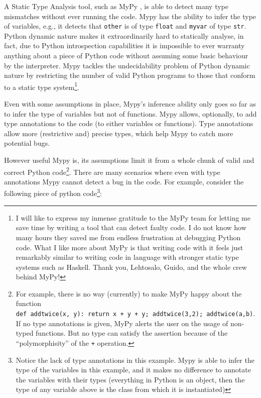 \documentclass[
11pt, %
english, %
singlespacing, %
headsepline, %
]{MastersDoctoralThesis} %
\begin{document}
A Static Type Analysis tool, such as MyPy \autocite{lehtosalo2016mypy},
is able to detect many type mismatches without ever running the code.
Mypy has the ability to infer the type of variables, e.g., it detects
that \texttt{other} is of type \texttt{float} and \texttt{myvar} of type
\texttt{str}. Python dynamic nature makes it extraordinarily hard to
statically analyse, in fact, due to Python introspection capabilities it
is impossible to ever warranty anything about a piece of Python code
without assuming some basic behaviour by the interpreter. Mypy tackles
the undecidability problem of Python dynamic nature by restricting the
number of valid Python programs to those that conform to a static type
system\footnote{I will like to express my inmense gratitude to the MyPy
  team for letting me save time by writing a tool that can detect faulty
  code. I do not know how many hours they saved me from endless
  frustration at debugging Python code. What I like more about MyPy is
  that writing code with it feels just remarkably similar to writing
  code in language with stronger static type systems such as Haskell.
  Thank you, Lehtosalo, Guido, and the whole crew behind MyPy!}.

Even with some assumptions in place, Mypy's inference ability only goes
so far as to infer the type of variables but not of functions. Mypy
allows, optionally, to add type annotations to the code (to either
variables or functions). Type annotations allow more (restrictive and)
precise types, which help Mypy to catch more potential bugs.

However useful Mypy is, its assumptions limit it from a whole chunk of
valid and correct Python code\footnote{For example, there is no way
  (currently) to make MyPy happy about the function
  \texttt{def\ addtwice(x,\ y):\ return\ x\ +\ y\ +\ y;\ addtwice(3,2);\ addtwice(\textquotesingle{}a\textquotesingle{},\textquotesingle{}b\textquotesingle{})}.
  If no type annotations is given, MyPy alerts the user on the usage of
  non-typed functions. But no type can satisfy the assertion because of
  the \enquote{polymorphisity} of the \texttt{+} operation.}. There are
many scenarios where even with type annotations Mypy cannot detect a bug
in the code. For example, consider the following piece of python
code\footnote{Notice the lack of type annotations in this example. Mypy
  is able to infer the type of the variables in this example, and it
  makes no difference to annotate the variables with their types
  (everything in Python is an object, then the type of any variable
  above is the class from which it is instantiated)}:
\end{document}
